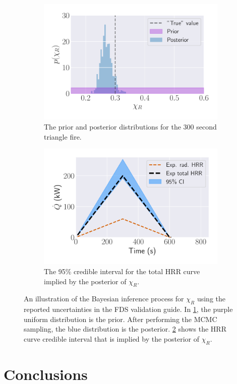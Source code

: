 \documentclass{article}
\begin{document}
\begin{figure}[htbp]
  \centering
  \begin{subfigure}[t]{.45\textwidth}
      \centering
      \includegraphics[width=\textwidth,keepaspectratio]{figures/bayes_distributions_300s_triangle.pdf}
      \caption{The prior and posterior distributions for the 300 second triangle fire.}
      \label{fig:prior_posterior}
  \end{subfigure}
  \begin{subfigure}[t]{.45\textwidth}
      \centering
      \includegraphics[width=\textwidth ,keepaspectratio]{figures/bayes_burner_result.pdf}
      \caption{The 95\% credible interval for the total HRR curve implied by the posterior of $\chi_R$.}
      \label{fig:bayes_burner_result}
  \end{subfigure}
  \caption{An illustration of the Bayesian inference process for $\chi_R$ using the reported uncertainties in the FDS validation guide. In \protect\ref{fig:prior_posterior}, the purple uniform distribution is the prior. After performing the MCMC sampling, the blue distribution is the posterior. \protect\ref{fig:bayes_burner_result} shows the HRR curve credible interval that is implied by the posterior of $\chi_R$.} 
  \label{fig:bayes_results}
\end{figure}
\section{Conclusions}


\clearpage


\end{document}
